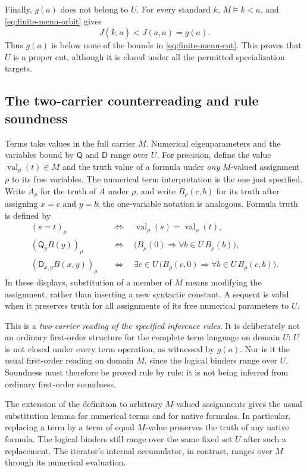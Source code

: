 Finally, $g(a)$ does not belong to $U$.  For every standard $k$,
$M\models\overline{k}<a$, and \eqref{eq:finite-menu-orbit} gives
\[
 J(\overline{k},a)<J(a,a)=g(a).
\]
Thus $g(a)$ is below none of the bounds in
\eqref{eq:finite-menu-cut}.  This proves that $U$ is a proper cut, although
it is closed under all the permitted specialization targets.

\subsection{The two-carrier counterreading and rule soundness}

Terms take values in the full carrier $M$.  Numerical eigenparameters and
the variables bound by $\mathsf Q$ and $\mathsf D$ range over $U$.  For
precision, define the value $\operatorname{val}_{\rho}(t)\in M$ and the
truth value of a formula under \emph{any} $M$-valued assignment $\rho$ to
its free variables.  The numerical term interpretation is the one just
specified.  Write $A_\rho$ for the truth of $A$ under $\rho$, and write
$B_\rho(c,b)$ for its truth after assigning $x=c$ and $y=b$; the one-variable
notation is analogous.  Formula truth is defined by
\begin{align*}
 (s=t)_\rho
 &\quad\Longleftrightarrow\quad
   \operatorname{val}_{\rho}(s)=\operatorname{val}_{\rho}(t),\\
 (\mathsf Q_yB(y))_\rho
 &\quad\Longleftrightarrow\quad
   \bigl(B_\rho(0)\Longrightarrow\forall b\in U\,B_\rho(b)\bigr),\\
 (\mathsf D_{x,y}B(x,y))_\rho
 &\quad\Longleftrightarrow\quad
   \exists c\in U\,
   \bigl(B_\rho(c,0)\Longrightarrow\forall b\in U\,B_\rho(c,b)\bigr).
\end{align*}
In these displays, substitution of a member of $M$ means modifying the
assignment, rather than inserting a new syntactic constant.  A sequent is
valid when it preserves truth for all assignments of its free numerical
parameters to $U$.

This is a \emph{two-carrier reading of the specified inference rules}.
It is deliberately not an ordinary first-order structure for the complete
term language on domain $U$: $U$ is not closed under every term operation,
as witnessed by $g(a)$.  Nor is it the usual first-order reading on domain
$M$, since the logical binders range over $U$.  Soundness must therefore
be proved rule by rule; it is not being inferred from ordinary
first-order soundness.

The extension of the definition to arbitrary $M$-valued assignments gives
the usual substitution lemma for numerical terms and for native formulas.
In particular, replacing a term by a term of equal $M$-value preserves the
truth of any native formula.  The logical binders still range over the
same fixed set $U$ after such a replacement.  The iterator's internal
accumulator, in contrast, ranges over $M$ through its numerical evaluation.

